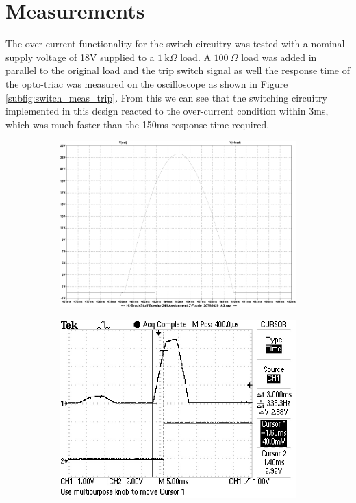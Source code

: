 \section{Measurements} \label{sec:sw_meas}
The over-current functionality for the switch circuitry was tested with a nominal supply voltage of 18V supplied to a $\SI{1}{\kilo \Omega}$ load. A $\SI{100}{\Omega}$ load was added in parallel to the original load and the trip switch signal as well the response time of the opto-triac was measured on the oscilloscope as shown in Figure \ref{subfig:switch_meas_trip}. From this we can see that the switching circuitry implemented in this design reacted to the over-current condition within 3ms, which was much faster than the 150ms response time required.

\begin{figure}[!ht]
 \footnotesize
 \centering
    \begin{subfigure}[]{0.4\textwidth}
              \centering
  		\includegraphics[width=1.0\linewidth]{./Figures/switch_simu_trip.pdf}
		    \caption{} \label{subfig:switch_simu_trip}
     \end{subfigure}
          \begin{subfigure}[]{0.4\textwidth}
             \centering
  		\includegraphics[width=1.0\linewidth]{./Figures/switch_meas_trip.JPG}

\end{subfigure}
\end{figure}
